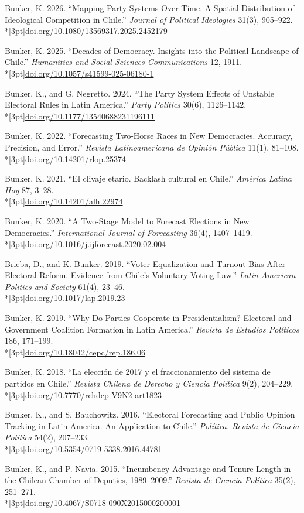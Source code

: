 \documentclass[11pt,letterpaper]{article}
\newif\ifafterhead
\newlength{\entrygap}\setlength{\entrygap}{8.5pt}
\newcommand{\gap}{\ifafterhead\global\afterheadfalse\else\vspace{\entrygap}\fi}
\newcommand{\entry}[1]{\par\gap\hangindent=13pt\hangafter=1\noindent #1\par}
\newcommand{\doi}[1]{\\*[3pt]{\small\href{https://doi.org/#1}{doi.org/#1}}}
\begin{document}
\entry{Bunker, K. 2026. ``Mapping Party Systems Over Time. A Spatial Distribution of Ideological Competition in Chile.'' \textit{Journal of Political Ideologies} 31(3), 905--922.\doi{10.1080/13569317.2025.2452179}}

\entry{Bunker, K. 2025. ``Decades of Democracy. Insights into the Political Landscape of Chile.'' \textit{Humanities and Social Sciences Communications} 12, 1911.\doi{10.1057/s41599-025-06180-1}}

\entry{Bunker, K., and G. Negretto. 2024. ``The Party System Effects of Unstable Electoral Rules in Latin America.'' \textit{Party Politics} 30(6), 1126--1142.\doi{10.1177/13540688231196111}}

\entry{Bunker, K. 2022. ``Forecasting Two-Horse Races in New Democracies. Accuracy, Precision, and Error.'' \textit{Revista Latinoamericana de Opinión Pública} 11(1), 81--108.\doi{10.14201/rlop.25374}}

\entry{Bunker, K. 2021. ``El clivaje etario. Backlash cultural en Chile.'' \textit{América Latina Hoy} 87, 3--28.\doi{10.14201/alh.22974}}

\entry{Bunker, K. 2020. ``A Two-Stage Model to Forecast Elections in New Democracies.'' \textit{International Journal of Forecasting} 36(4), 1407--1419.\doi{10.1016/j.ijforecast.2020.02.004}}

\entry{Brieba, D., and K. Bunker. 2019. ``Voter Equalization and Turnout Bias After Electoral Reform. Evidence from Chile's Voluntary Voting Law.'' \textit{Latin American Politics and Society} 61(4), 23--46.\doi{10.1017/lap.2019.23}}

\entry{Bunker, K. 2019. ``Why Do Parties Cooperate in Presidentialism? Electoral and Government Coalition Formation in Latin America.'' \textit{Revista de Estudios Políticos} 186, 171--199.\doi{10.18042/cepc/rep.186.06}}

\entry{Bunker, K. 2018. ``La elección de 2017 y el fraccionamiento del sistema de partidos en Chile.'' \textit{Revista Chilena de Derecho y Ciencia Política} 9(2), 204--229.\doi{10.7770/rchdcp-V9N2-art1823}}

\entry{Bunker, K., and S. Bauchowitz. 2016. ``Electoral Forecasting and Public Opinion Tracking in Latin America. An Application to Chile.'' \textit{Política. Revista de Ciencia Política} 54(2), 207--233.\doi{10.5354/0719-5338.2016.44781}}

\entry{Bunker, K., and P. Navia. 2015. ``Incumbency Advantage and Tenure Length in the Chilean Chamber of Deputies, 1989--2009.'' \textit{Revista de Ciencia Política} 35(2), 251--271.\doi{10.4067/S0718-090X2015000200001}}
\end{document}
